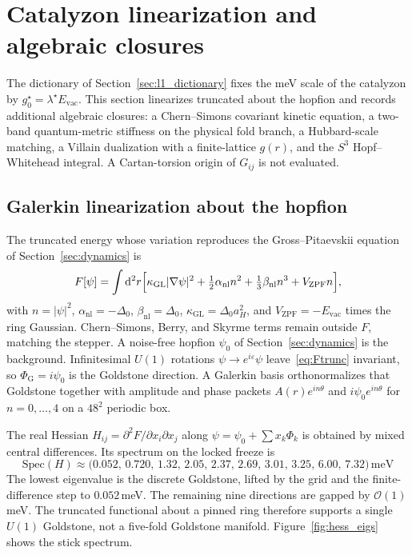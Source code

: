 \section{Catalyzon linearization and algebraic closures}
\label{sec:l1_closure}

The dictionary of Section~\ref{sec:l1_dictionary} fixes the meV scale of the catalyzon by $g_0^\star=\lambda^\star E_{\mathrm{vac}}$. This section linearizes truncated \TQGL{} about the hopfion and records additional algebraic closures: a Chern--Simons covariant kinetic equation, a two-band quantum-metric stiffness on the physical fold branch, a Hubbard-scale matching, a Villain dualization with a finite-lattice $g(r)$, and the $S^3$ Hopf--Whitehead integral. A Cartan-torsion origin of $G_{ij}$ is not evaluated.

\subsection{Galerkin linearization about the hopfion}
\label{sec:lin_tqgl}

The truncated energy whose variation reproduces the Gross--Pitaevskii equation of Section~\ref{sec:dynamics} is
\begin{equation}
F[\psi]
=\int\mathrm{d}^2r\Bigl[
\kappa_{\mathrm{GL}}|\nabla\psi|^2
+\tfrac12\alpha_{\mathrm{nl}}n^2
+\tfrac13\beta_{\mathrm{nl}}n^3
+V_{\mathrm{ZPF}}n
\Bigr],
\label{eq:Ftrunc}
\end{equation}
with $n=|\psi|^2$, $\alpha_{\mathrm{nl}}=-\Delta_0$, $\beta_{\mathrm{nl}}=\Delta_0$, $\kappa_{\mathrm{GL}}=\Delta_0 a_H^2$, and $V_{\mathrm{ZPF}}=-E_{\mathrm{vac}}$ times the ring Gaussian. Chern--Simons, Berry, and Skyrme terms remain outside $F$, matching the stepper. A noise-free hopfion $\psi_0$ of Section~\ref{sec:dynamics} is the background. Infinitesimal $U(1)$ rotations $\psi\to e^{i\varepsilon}\psi$ leave~\eqref{eq:Ftrunc} invariant, so $\Phi_{\mathrm{G}}=i\psi_0$ is the Goldstone direction. A Galerkin basis orthonormalizes that Goldstone together with amplitude and phase packets $A(r)e^{in\theta}$ and $i\psi_0 e^{in\theta}$ for $n=0,\ldots,4$ on a $48^2$ periodic box.

The real Hessian $H_{ij}=\partial^2 F/\partial x_i\partial x_j$ along $\psi=\psi_0+\sum x_k\Phi_k$ is obtained by mixed central differences. Its spectrum on the locked freeze is
\begin{equation}
\mathrm{Spec}(H)\approx
\bigl(0.052,\,0.720,\,1.32,\,2.05,\,2.37,\,2.69,\,3.01,\,3.25,\,6.00,\,7.32\bigr)\,\mathrm{meV}
\label{eq:hess_spec}
\end{equation}
The lowest eigenvalue is the discrete Goldstone, lifted by the grid and the finite-difference step to $0.052$\,meV. The remaining nine directions are gapped by $\mathcal{O}(1)$\,meV. The truncated functional about a pinned ring therefore supports a single $U(1)$ Goldstone, not a five-fold Goldstone manifold. Figure~\ref{fig:hess_eigs} shows the stick spectrum.

